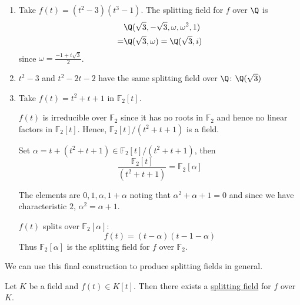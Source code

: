 \documentclass{article}
\begin{document}
\begin{eg}
\begin{enumerate}
        \item Take $f(t) = (t^2 - 3)(t^3 - 1)$. The splitting field for $f$ over $\Q$ is
            \begin{align*}
                &\Q(\sqrt{3}, -\sqrt{3}, \omega, \omega^2, 1) \\
                = &\Q(\sqrt{3}, \omega) = \Q(\sqrt{3}, i)
            \end{align*}
            since $\omega = \frac{-1 + i \sqrt{3}}{2}$.
        \item $t^2 - 3$ and $t^2 - 2t - 2$ have the same splitting field over $\Q$: $\Q(\sqrt{3})$
        \item Take $f(t) = t^2 + t + 1$ in $\mathbb{F}_2[t]$.

            $f(t)$ is irreducible over $\mathbb{F}_2$ since it has no roots in $\mathbb{F}_2$ and hence no linear factors in $\mathbb{F}_2[t]$.
            Hence, $\mathbb{F}_2[t]/(t^2 + t + 1)$ is a field.

            Set $\alpha = t + (t^2 + t + 1) \in \mathbb{F}_2[t]/(t^2 + t + 1)$, then
            \begin{equation*}
                \frac{\mathbb{F}_2[t]}{(t^2 + t + 1)} = \mathbb{F}_2[\alpha]
            \end{equation*}

            The elements are $0, 1, \alpha, 1+\alpha$ noting that $\alpha^2 + \alpha + 1 = 0$ and since we have characteristic $2$, $\alpha^2 = \alpha + 1$.

            $f(t)$ splits over $\mathbb{F}_2[\alpha]$:
            \begin{equation*}
                f(t) = (t-\alpha)(t-1-\alpha)
            \end{equation*}
            Thus $\mathbb{F}_2[\alpha]$ is the splitting field for $f$ over $\mathbb{F}_2$.
    \end{enumerate}
\end{eg}
We can use this final construction to produce splitting fields in general.

\begin{nthm}\label{thm:1.23}
    Let $K$ be a field and $f(t) \in K[t]$. Then there exists a \hyperlink{def:splitting}{splitting field} for $f$ over $K$.
\end{nthm}
\end{document}
